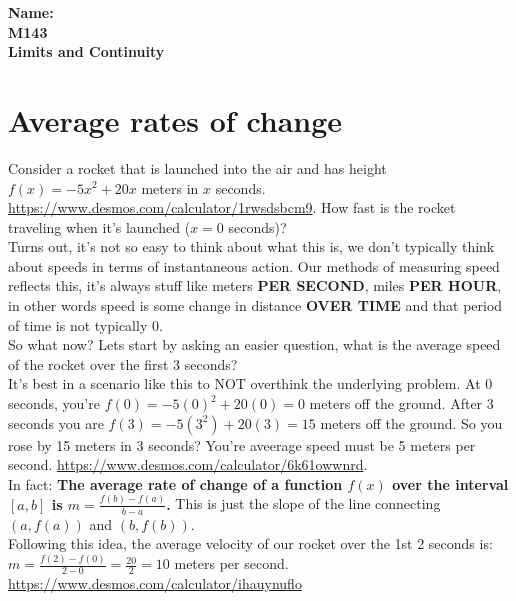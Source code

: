 \documentclass[10pt]{article}
\theoremstyle{definition}
\begin{document}
%

{\bf Name:} \hrulefill\hrulefill\hrulefill\\
{\bf M143} \qquad \qquad \\
{\bf Limits and Continuity}\\ %

\section{Average rates of change}

Consider a rocket that is launched into the air and has height $f(x)=-5x^2+20x$ meters in $x$ seconds. \url{https://www.desmos.com/calculator/1rwsdsbcm9}. How fast is the rocket traveling when it's launched ($x=0$ seconds)?\\

Turns out, it's not so easy to think about what this is, we don't typically think about speeds in terms of instantaneous action.  Our methods of measuring speed reflects this, it's always stuff like meters {\bf PER SECOND}, miles {\bf PER HOUR}, in other words speed is some change in distance {\bf OVER TIME} and that period of time is not typically 0.\\

So what now?  Lets start by asking an easier question, what is the average speed of the rocket over the first 3 seconds?\\

It's best in a scenario like this to NOT overthink the underlying problem.  At 0 seconds, you're $f(0)=-5(0)^2+20(0)=0$ meters off the ground.  After 3 seconds you are $f(3)=-5(3^2)+20(3)=15$ meters off the ground.  So you rose by 15 meters in 3 seconds?  You're aveerage speed must be 5 meters per second. \url{https://www.desmos.com/calculator/6k61owwnrd}.\\

In fact:  {\bf The average rate of change of a function $f(x)$ over the interval $[a,b]$ is $m=\frac{f(b)-f(a)}{b-a}$.}  This is just the slope of the line connecting $(a,f(a))$ and $(b,f(b))$.\\

Following this idea, the average velocity of our rocket over the 1st 2 seconds is: $m=\frac{f(2)-f(0)}{2-0}=\frac{20}{2}=10$ meters per second. \url{https://www.desmos.com/calculator/ihauynuflo}\\
\end{document}
